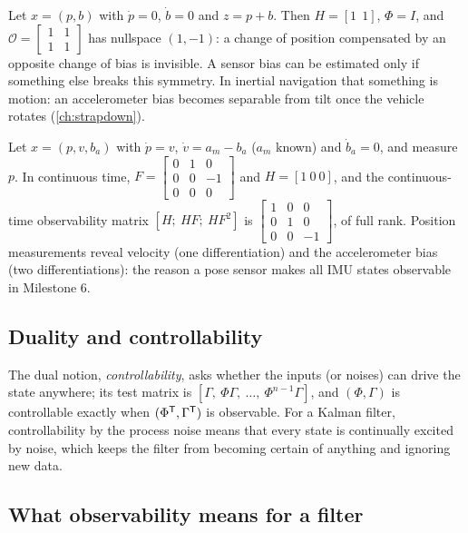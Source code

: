 \begin{example}
Let $x = (p, b)$ with $\dot p = 0$, $\dot b = 0$ and $z = p + b$. Then $H = [1\ \ 1]$, $\Phi = I$, and $\mathcal O = \begin{bmatrix}1 & 1\\1 & 1\end{bmatrix}$ has nullspace $(1, -1)$: a
change of position compensated by an opposite change of bias is invisible. A sensor bias can be estimated only if something else breaks this
symmetry. In inertial navigation that something is motion: an accelerometer bias becomes separable from tilt once the vehicle rotates
(\cref{ch:strapdown}).
\end{example}

\begin{example}
Let $x = (p, v, b_a)$ with $\dot p = v$, $\dot v = a_m - b_a$ ($a_m$ known) and $\dot b_a = 0$, and measure $p$. In continuous time,
$F = \begin{bmatrix}0&1&0\\0&0&-1\\0&0&0\end{bmatrix}$ and $H = [1\ 0\ 0]$, and the continuous-time observability matrix $[H;\ HF;\ HF^2]$ is
$\begin{bmatrix}1&0&0\\0&1&0\\0&0&-1\end{bmatrix}$, of full rank. Position measurements reveal velocity (one differentiation) and the accelerometer bias (two
differentiations): the reason a pose sensor makes all IMU states observable in Milestone 6.
\end{example}

\subsection{Duality and controllability}

The dual notion, \emph{controllability}, asks whether the inputs (or noises) can drive the state anywhere; its test matrix is
$[\Gamma,\ \Phi\Gamma,\ \dots,\ \Phi^{n-1}\Gamma]$, and $(\Phi, \Gamma)$ is controllable exactly when $(\Phi^{\mathsf{T}}, \Gamma^{\mathsf{T}})$ is observable. For a Kalman filter,
controllability by the process noise means that every state is continually excited by noise, which keeps the filter from becoming certain
of anything and ignoring new data.

\subsection{What observability means for a filter}

